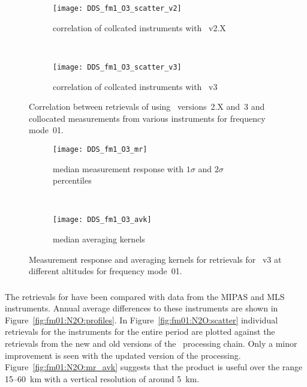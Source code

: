 \begin{figure}[tbhp]
    \centering
    \begin{subfigure}[b]{0.49\textwidth}
        \texttt{[image: DDS\_fm1\_O3\_scatter\_v2]}
        \caption{correlation of collcated instruments with \smr~v2.X}
        \label{fig:fm01:O3:scatter:v2}
    \end{subfigure}
    \,
    \begin{subfigure}[b]{0.49\textwidth}
        \texttt{[image: DDS\_fm1\_O3\_scatter\_v3]}
        \caption{correlation of collcated instruments with \smr~v3}
        \label{fig:fm01:O3:scatter:v3}
    \end{subfigure}
    \caption{Correlation between retrievals of  using \smr\
    versions~2.X and~3 and collocated measurements from various instruments
    for frequency mode~01.}
    \label{fig:fm01:O3:scatter}
\end{figure}

\begin{figure}[tbhp]
    \centering
    \begin{subfigure}[b]{0.49\textwidth}
        \texttt{[image: DDS\_fm1\_O3\_mr]}
        \caption{median measurement response with $1\sigma$ and $2\sigma$
        percentiles}
        \label{fig:fm01:O3:mr}
    \end{subfigure}
    \,
    \begin{subfigure}[b]{0.49\textwidth}
        \texttt{[image: DDS\_fm1\_O3\_avk]}
        \caption{median averaging kernels\newline~}
        \label{fig:fm01:O3:avk}
    \end{subfigure}
    \caption{Measurement response and averaging kernels for 
    retrievals for \smr~v3 at different altitudes for frequency mode~01.}
    \label{fig:fm01:O3:mr_avk}
\end{figure}



\subsubsection{}
\label{sec:fm01:comparison:N2O}
The retrievals for \chem{N_2O} have been compared with data from the MIPAS and
MLS instruments. Annual average differences to these instruments are shown in
Figure~\ref{fig:fm01:N2O:profiles}. In Figure~\ref{fig:fm01:N2O:scatter}
individual retrievals for the instruments for the entire period are plotted
against the retrievals from the new and old versions of the \smr\ processing
chain. Only a minor improvement is seen with the updated version of the
processing. Figure~\ref{fig:fm01:N2O:mr_avk} suggests that the product is
useful over the range 15--60~km with a vertical resolution of around 5~km.


